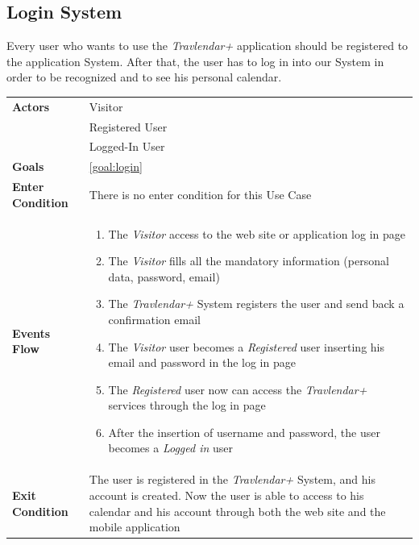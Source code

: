 \subsection{Login System}
Every user who wants to use the \emph{Travlendar+} application should be registered to the application System.
After that, the user has to log in into our System in order to be recognized and to see his personal calendar.

\begin{table}[H]
	\centering
    
    \begin{tabular}{|p{3.5cm}|p{10.3cm}|}
    
    \hline
    \textbf{\large{Actors}}  			& \tabitem Visitor 									\\
    				 					& \tabitem Registered User							\\
                     					& \tabitem Logged-In User 							\\
    \hline
    \textbf{\large{Goals}} 				& \ref{goal:login} 									\\
    
    \hline
    \textbf{\large{Enter Condition}}	& There is no enter condition for this Use Case		\\
    
    \hline
    \textbf{\large{Events Flow}}		& \begin{enumerate}[leftmargin=0.5cm]
                                          	\item The \emph{Visitor}  access to the web site or application log in page
                                            \item The \emph{Visitor} fills all the mandatory information (personal data, password, email)
                                            \item The \emph{Travlendar+} System registers the user and send back a confirmation email
                                            \item The \emph{Visitor} user becomes a \emph{Registered} user inserting his email and password in the log in page   
                                            \item The \emph{Registered} user now can access the \emph{Travlendar+} services through the log in page
                                            
                                            \item After the insertion of username and password, the user becomes a \emph{Logged in} user
                                          \end{enumerate}
    										\\
    \hline
    \textbf{\large{Exit Condition}} 	& The user is registered in the \emph{Travlendar+} System, and his account is created. Now the user is able to access to his 													calendar and his account through both the web site and the mobile application \\
    

\end{tabular}
\end{table}
